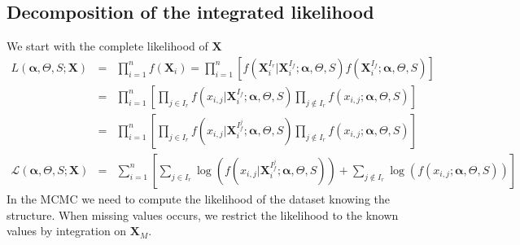 \documentclass[12pt,a4paper]{report}
\begin{document}
	\subsection{Decomposition of the integrated likelihood}
We start with the complete likelihood of $\boldsymbol{X}$
\begin{eqnarray}
	L(\boldsymbol{\alpha},\Theta,S;\boldsymbol{X})&=& \prod_{i=1}^n f(\boldsymbol{X}_i)= \prod_{i=1}^n\left[f(\boldsymbol{X}_i^{I_r}|\boldsymbol{X}_i^{I_f};\boldsymbol{\alpha},\Theta,S)f(\boldsymbol{X}_i^{I_f};\boldsymbol{\alpha},\Theta,S) \right] \\
	&=&\prod_{i=1}^n\left[\prod_{j \in I_r}f(x_{i,j}|\boldsymbol{X}_i^{I_f};\boldsymbol{\alpha},\Theta,S)\prod_{j \notin I_r} f(x_{i,j};\boldsymbol{\alpha},\Theta,S) \right] \\
	&=&\prod_{i=1}^n\left[\prod_{j \in I_r}f(x_{i,j}|\boldsymbol{X}_i^{I_f^j};\boldsymbol{\alpha},\Theta,S)\prod_{j \notin I_r} f(x_{i,j};\boldsymbol{\alpha},\Theta,S) \right] \\
	\mathcal{L}(\boldsymbol{\alpha},\Theta,S;\boldsymbol{X})&=&\sum_{i=1}^n\left[\sum_{j \in I_r}\log \left(f(x_{i,j}|\boldsymbol{X}_i^{I_f^j};\boldsymbol{\alpha},\Theta,S)\right)+\sum_{j \notin I_r} \log \left(f(x_{i,j};\boldsymbol{\alpha},\Theta,S)\right) \right] \label{loglikmiss}
\end{eqnarray}
		In the MCMC we need to compute the likelihood of the dataset knowing the structure. When missing values occurs, we restrict the likelihood to the known values by integration on $\boldsymbol{X}_M$.
				 		
\end{document}
